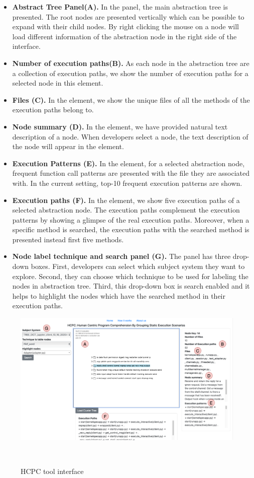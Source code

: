 \begin{itemize}
    \item \textbf{Abstract Tree Panel(A).} In the panel, the main abstraction tree is presented. The root nodes are presented vertically which can be possible to expand with their child nodes. By right clicking the mouse on a node will load different information of the abstraction node in the right side of the interface.
    \item \textbf{Number of execution paths(B).} As each node in the abstraction tree are a collection of execution paths, we show the number of execution paths for a selected node in this element.
    \item \textbf{Files (C).} In the element, we show the unique files of all the methods of the execution paths belong to.
    \item \textbf{Node summary (D).} In the element, we have provided natural text description of a node. When developers select a node, the text description of the node will appear in the element. 
    \item \textbf{Execution Patterns (E).} In the element, for a selected abstraction node, frequent function call patterns are presented with the file they are associated with. In the current setting, top-10 frequent execution patterns are shown. 
    
    \item \textbf{Execution paths (F).} In the element, we show five execution paths of a selected abstraction node. The execution paths complement the execution patterns by showing a glimpse of the real execution paths. Moreover, when a specific method is searched, the execution paths with the searched method is presented instead first five methods.
    
    \item \textbf{ Node label technique and search panel (G).} The panel has three drop-down boxes. First, developers can select which subject system they want to explore. Second, they can choose which technique to be used for labeling the nodes in abstraction tree. Third, this drop-down box is search enabled and it helps to highlight the nodes which have the searched method in their execution paths.
\end{itemize}

\begin{figure}[h]
  \centering
  \includegraphics[width=\columnwidth]{figures/hla3/hla3_interface.png}
  \caption{HCPC tool interface }~\label{fig:interface}
\end{figure}


